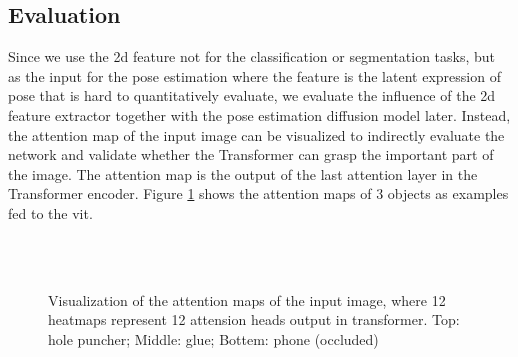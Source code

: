 \documentclass[12pt,DIV14,BCOR12mm,a4paper,footinclude=false,headinclude,parskip=half-,twoside,openright,cleardoublepage=empty,toc=index,bibliography=totoc,listof=totoc]{scrreprt}
\numberwithin{equation}{chapter}
\begin{document}
\subsection{Evaluation}
Since we use the \gls{2d} feature not for the classification or segmentation tasks, but as the input for the pose estimation where the feature is the latent expression of pose that is hard to quantitatively evaluate, we evaluate the influence of the \gls{2d} feature extractor together with the pose estimation diffusion model later. Instead, the attention map of the input image can be visualized to indirectly evaluate the network and validate whether the Transformer can grasp the important part of the image. The attention map is the output of the last attention layer in the Transformer encoder. Figure \ref{img:atten} shows the attention maps of 3 objects as examples fed to the \gls{vit}.

\begin{figure}[h]
  \centering
   \\
  \centering
   \\
  \centering
  \caption{Visualization of the attention maps of the input image, where 12 heatmaps represent 12 attension heads output in transformer. Top: hole puncher; Middle: glue; Bottem: phone (occluded)}
  \label{img:atten}
\end{figure}
\end{document}
